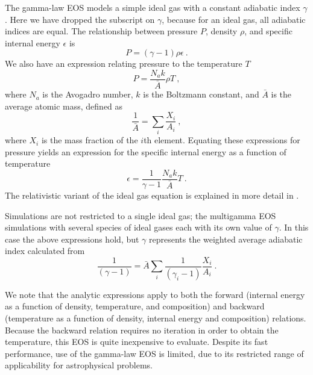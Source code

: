 The gamma-law%
EOS models a simple
ideal gas with a constant adiabatic index $\gamma$. Here we have
dropped the subscript on $\gamma$, because for an ideal gas, all
adiabatic indices are equal.  The relationship between pressure $P$,
density $\rho$, and specific internal energy $\epsilon$ is
\begin{equation}
\label {Eqn:eos2b}
P = \left(\gamma - 1\right)\rho\epsilon~.
\end{equation}
We also have an expression relating pressure to the temperature $T$
\begin{equation}
\label {Eqn:eos2a}
P = \frac{N_a k}{\bar{A}} \rho T ~,
\end{equation}
where $N_a$ is the Avogadro number, $k$ is the Boltzmann
constant, and $\bar{A}$ is the average atomic mass, defined as
\begin{equation}
\frac{1}{\bar{A}} = \sum_{i}\frac{X_{i}}{A_{i}}~,
\end{equation}
where $X_i$ is the mass fraction of the $i$th element.
Equating these expressions for pressure yields an expression for the
specific internal energy as a function of temperature
\begin{equation}
\epsilon = \frac{1}{\gamma - 1} \frac{N_a k} {\bar{A}} T~.
\end{equation}
The relativistic variant of the ideal gas equation is explained in more detail
in .


Simulations are not restricted to a single ideal gas; the multigamma
EOS%
simulations with several species of ideal gases each with its own
value of $\gamma$. In this case the above expressions hold, but
$\gamma$ represents the weighted average adiabatic index calculated
from
\begin{equation}
\frac{1}{\left(\gamma - 1\right)} = \bar{A}\sum_{i}\frac{1}{\left(\gamma_{i} -
1\right)}\frac{X_{i}}{A_{i}}~.
\end{equation}

We note that the analytic expressions apply to both the forward
(internal energy as a function of density, temperature, and
composition) and backward (temperature as a function of density,
internal energy and composition) relations.  Because the backward
relation requires no iteration in order to obtain the temperature,
this EOS is quite inexpensive to evaluate.  Despite its fast performance,
use of the gamma-law EOS is limited, due to its restricted range of
applicability for astrophysical problems.


